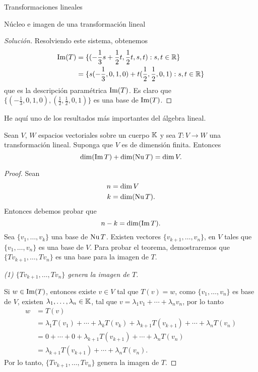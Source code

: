 \begin{chapter}{Transformaciones lineales}
\begin{section}{N\'ucleo e imagen de una transformaci\'on lineal}
\begin{proof}[Solución]
    
    Resolviendo este sistema, obtenemos
    \begin{align*}
        \operatorname{Im}(T) &=  \{(-\frac13 s + \frac12 t, \frac 12 t, s,t): s,t \in \mathbb R \}\\
        &=  \{s(-\frac13,0,1,0)+t(\frac12,\frac12,0,1): s,t \in \mathbb R \}
    \end{align*}
    que es la descripción paramétrica $\operatorname{Im}(T)$.  Es claro que  $\{(-\frac13,0,1,0),(\frac12,\frac12,0,1) \}$ es una base de $\operatorname{Im}(T)$.
\end{proof}

        He aquí uno de los resultados más importantes del álgebra lineal.
        
        \begin{teorema}\label{rang+nul=dimV}
                 Sean $V$, $W$ espacios vectoriales sobre un cuerpo $\mathbb K$ y sea $T:V \to W$ una transformación lineal. Suponga que $V$ es de dimensión finita. Entonces 
                 $$
                 \dim (\operatorname{Im} T) + \dim (\operatorname{Nu} T) = \dim V.
                 $$
        \end{teorema}
        \begin{proof} Sean 
            \begin{align*}
                n &= \dim V \\
                k &= \dim(\operatorname{Nu} T).  
            \end{align*}
            Entonces debemos probar  que 
            $$
            n-k = \dim(\operatorname{Im} T).
            $$
             Sea $\{v_1,\ldots,v_k \}$ una base de $\operatorname{Nu} T$. Existen vectores $\{v_{k+1},\ldots,v_n \}$, en $V$ tales que $\{v_1,\ldots,v_n \}$ es una base de $V$. Para probar el teorema, demostraremos que 
             $\{Tv_{k+1},\ldots,Tv_n \}$ es una base para la imagen de $T$. 
             
              \textit{(1) $\{Tv_{k+1},\ldots,Tv_n \}$ genera la imagen de $T$.} 
              
              Si $w \in \operatorname{Im}(T)$,  entonces existe $v \in V$ tal que $T(v)=w$, como $\{v_{1},\ldots,v_n \}$ es base de $V$,  existen $\lambda_1,\ldots,\lambda_{n} \in \mathbb K$,  tal que $v=  \lambda_1 v_1+ \cdots + \lambda_n v_n$, por lo tanto 
             \begin{align*}
                 w &= T(v) \\ 
                 &=  \lambda_1T( v_1)+ \cdots + \lambda_kT( v_k)+ \lambda_{k+1}T( v_{k+1}) +\cdots+ \lambda_nT( v_n) \\
                 &=  0+ \cdots + 0+ \lambda_{k+1}T( v_{k+1}) +\cdots+ \lambda_nT( v_n) \\
                 &=  \lambda_{k+1}T( v_{k+1}) +\cdots+ \lambda_nT( v_n).
             \end{align*}
             Por  lo tanto, $\{Tv_{k+1},\ldots,Tv_n \}$ genera la imagen de $T$. 
             

\end{proof}
\end{section}
\end{chapter}
